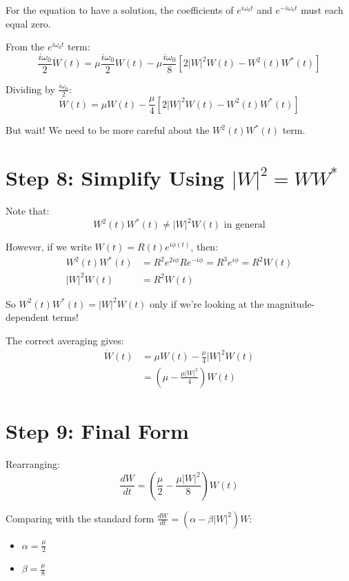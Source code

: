 \documentclass{article}
\begin{document}
For the equation to have a solution, the coefficients of $e^{i\omega_0 t}$ and $e^{-i\omega_0 t}$ must each equal zero.

From the $e^{i\omega_0 t}$ term:
\begin{equation}
\frac{i\omega_0}{2}\dot{W}(t) = \mu\frac{i\omega_0}{2}W(t) - \mu\frac{i\omega_0}{8}[2|W|^2 W(t) - W^2(t)W^*(t)]
\end{equation}

Dividing by $\frac{i\omega_0}{2}$:
\begin{equation}
\dot{W}(t) = \mu W(t) - \frac{\mu}{4}[2|W|^2 W(t) - W^2(t)W^*(t)]
\end{equation}

But wait! We need to be more careful about the $W^2(t)W^*(t)$ term.

\section{Step 8: Simplify Using $|W|^2 = WW^*$}

Note that:
\begin{equation}
W^2(t)W^*(t) \neq |W|^2 W(t) \text{ in general}
\end{equation}

However, if we write $W(t) = R(t)e^{i\phi(t)}$, then:
\begin{align}
W^2(t)W^*(t) &= R^2 e^{2i\phi} R e^{-i\phi} = R^3 e^{i\phi} = R^2 W(t) \\
|W|^2 W(t) &= R^2 W(t)
\end{align}

So $W^2(t)W^*(t) = |W|^2 W(t)$ only if we're looking at the magnitude-dependent terms!

The correct averaging gives:
\begin{align}
\dot{W}(t) &= \mu W(t) - \frac{\mu}{4}|W|^2 W(t) \\
&= \left(\mu - \frac{\mu|W|^2}{4}\right)W(t)
\end{align}

\section{Step 9: Final Form}

Rearranging:
\begin{equation}
\frac{dW}{dt} = \left(\frac{\mu}{2} - \frac{\mu|W|^2}{8}\right)W(t)
\end{equation}

Comparing with the standard form $\frac{dW}{dt} = (\alpha - \beta|W|^2)W$:
\begin{itemize}
    \item $\alpha = \frac{\mu}{2}$
    \item $\beta = \frac{\mu}{8}$
\end{itemize}
\end{document}
